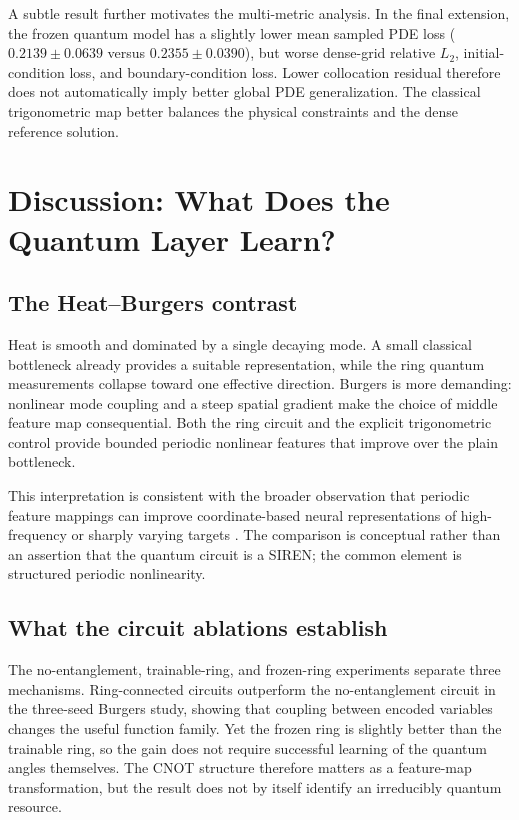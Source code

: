 \documentclass[10pt,a4paper]{article}
\begin{document}
A subtle result further motivates the multi-metric analysis. In the final extension, the frozen quantum model has a slightly lower mean sampled PDE loss ($0.2139\pm0.0639$ versus $0.2355\pm0.0390$), but worse dense-grid relative $L_2$, initial-condition loss, and boundary-condition loss. Lower collocation residual therefore does not automatically imply better global PDE generalization. The classical trigonometric map better balances the physical constraints and the dense reference solution.

\section{Discussion: What Does the Quantum Layer Learn?}

\subsection{The Heat--Burgers contrast}

Heat is smooth and dominated by a single decaying mode. A small classical bottleneck already provides a suitable representation, while the ring quantum measurements collapse toward one effective direction. Burgers is more demanding: nonlinear mode coupling and a steep spatial gradient make the choice of middle feature map consequential. Both the ring circuit and the explicit trigonometric control provide bounded periodic nonlinear features that improve over the plain bottleneck.

This interpretation is consistent with the broader observation that periodic feature mappings can improve coordinate-based neural representations of high-frequency or sharply varying targets \cite{sitzmann2020}. The comparison is conceptual rather than an assertion that the quantum circuit is a SIREN; the common element is structured periodic nonlinearity.

\subsection{What the circuit ablations establish}

The no-entanglement, trainable-ring, and frozen-ring experiments separate three mechanisms. Ring-connected circuits outperform the no-entanglement circuit in the three-seed Burgers study, showing that coupling between encoded variables changes the useful function family. Yet the frozen ring is slightly better than the trainable ring, so the gain does not require successful learning of the quantum angles themselves. The CNOT structure therefore matters as a feature-map transformation, but the result does not by itself identify an irreducibly quantum resource.
\end{document}
